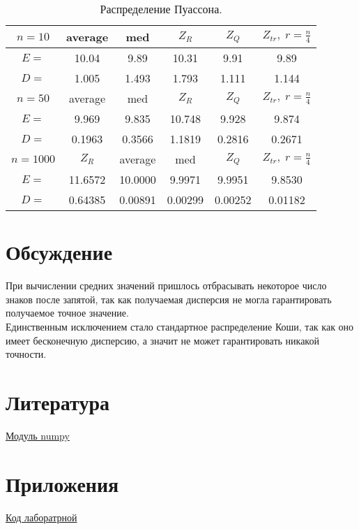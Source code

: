 \documentclass[a4]{article}
\begin{document}
		\begin{table}[h]
			\caption{ Распределение Пуассона.}
			\begin{center}
				\begin{tabular}{|c|c|c|c|c|c|}
					\hline
					$n = 10$   & average & med & $Z_R$ & $Z_Q$ & $Z_{tr},\;r=\frac{n}{4}$\\ \hline
					$E =$     & 10.04     &   9.89        & 10.31     &   9.91      &   9.89 \\ \hline
					$D =$     &  	1.005   &      1.493  &       1.793      &   1.111      &   1.144\\ \hline
					
					$n = 50$   & average & med & $Z_R$ & $Z_Q$ & $Z_{tr},\;r=\frac{n}{4}$\\ \hline
					$E =$      & 	9.969     &    9.835  &       10.748     &   9.928     &    9.874    \\ \hline
					$D =$       &	0.1963     &   0.3566   &      1.1819      &   0.2816      &   0.2671  \\ \hline
					
					$n = 1000$  & $Z_R$ & average & med  & $Z_Q$ & $Z_{tr},\;r=\frac{n}{4}$\\ \hline
					$E =$    &    11.6572  & 10.0000  &      9.9971         &    9.9951  &       9.8530\\ \hline
					$D =$    &       0.64385  & 	0.00891   &      0.00299        &   0.00252      &   0.01182  \\
					\hline
				\end{tabular}
			\end{center}
		\end{table}
		\newpage
			
	\section{Обсуждение}
		\par При вычислении средних значений пришлось отбрасывать некоторое число знаков после запятой, так как получаемая дисперсия не могла гарантировать получаемое точное значение.\\
		Единственным исключением стало стандартное распределение Коши, так как оно имеет бесконечную дисперсию, а значит не может гарантировать никакой точности.
		
		
		
	\section{Литература}
	
	\href{https://physics.susu.ru/vorontsov/language/numpy.html}{Модуль numpy}
	
	\section{Приложения}
	
	\href{https://github.com/dmitry-maltsov/PolyMatStat/blob/master/2/lab2.py}{Код лаборатрной}
	
	
\end{document}
